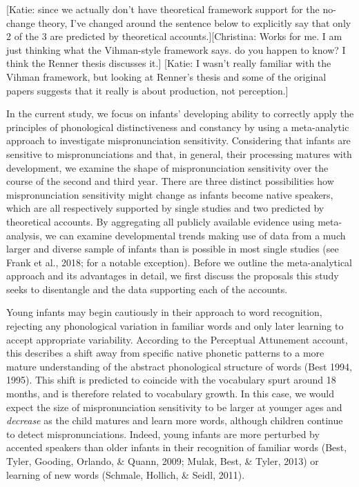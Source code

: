 \documentclass[man]{apa6}
\theoremstyle{definition}
\theoremstyle{definition}
\theoremstyle{definition}
\theoremstyle{remark}
\begin{document}
{[}Katie: since we actually don't have theoretical framework support for
the no-change theory, I've changed around the sentence below to
explicitly say that only 2 of the 3 are predicted by theoretical
accounts.{]}{[}Christina: Works for me. I am just thinking what the
Vihman-style framework says. do you happen to know? I think the Renner
thesis discusses it.{]} {[}Katie: I wasn't really familiar with the
Vihman framework, but looking at Renner's thesis and some of the
original papers suggests that it really is about production, not
perception.{]}

In the current study, we focus on infants' developing ability to
correctly apply the principles of phonological distinctiveness and
constancy by using a meta-analytic approach to investigate
mispronunciation sensitivity. Considering that infants are sensitive to
mispronunciations and that, in general, their processing matures with
development, we examine the shape of mispronunciation sensitivity over
the course of the second and third year. There are three distinct
possibilities how mispronunciation sensitivity might change as infants
become native speakers, which are all respectively supported by single
studies and two predicted by theoretical accounts. By aggregating all
publicly available evidence using meta-analysis, we can examine
developmental trends making use of data from a much larger and diverse
sample of infants than is possible in most single studies (see Frank et
al., 2018; for a notable exception). Before we outline the
meta-analytical approach and its advantages in detail, we first discuss
the proposals this study seeks to disentangle and the data supporting
each of the accounts.

Young infants may begin cautiously in their approach to word
recognition, rejecting any phonological variation in familiar words and
only later learning to accept appropriate variability. According to the
Perceptual Attunement account, this describes a shift away from specific
native phonetic patterns to a more mature understanding of the abstract
phonological structure of words (Best 1994, 1995). This shift is
predicted to coincide with the vocabulary spurt around 18 months, and is
therefore related to vocabulary growth. In this case, we would expect
the size of mispronunciation sensitivity to be larger at younger ages
and \emph{decrease} as the child matures and learn more words, although
children continue to detect mispronunciations. Indeed, young infants are
more perturbed by accented speakers than older infants in their
recognition of familiar words (Best, Tyler, Gooding, Orlando, \& Quann,
2009; Mulak, Best, \& Tyler, 2013) or learning of new words (Schmale,
Hollich, \& Seidl, 2011).
\end{document}
